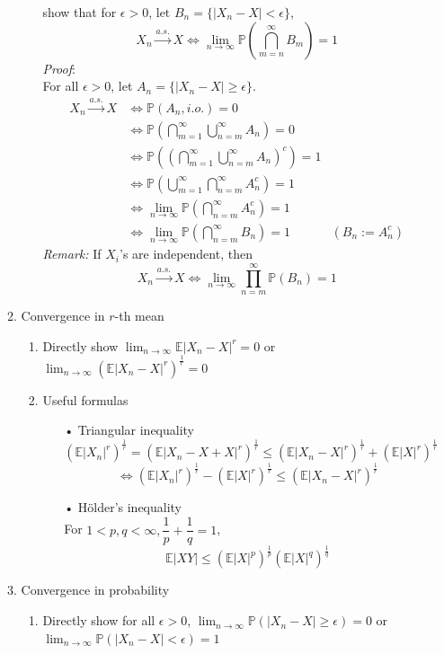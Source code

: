 \documentclass[11pt]{article}
\begin{document}
\begin{enumerate}
\begin{enumerate}
\begin{enumerate}
show that for $\epsilon>0$,  $\text{let }B_{n} = \{|X_{n} - X| < \epsilon \}$,
$$X_{n} \xrightarrow{a.s.} X \iff \lim_{n \to \infty} \mathbb{P}(\bigcap_{m=n}^{\infty}B_{m})=1$$
\textit{Proof}:\\
For all $\epsilon > 0$, let $A_{n} = \{|X_{n} - X| \geq \epsilon\}$.
\begin{align*}
X_{n} \xrightarrow{a.s.} X &\iff \mathbb{P}(A_{n}, i.o.) = 0\\
&\iff \mathbb{P}(\bigcap_{m=1}^{\infty} \bigcup_{n=m}^{\infty} A_{n}) = 0\\
&\iff \mathbb{P}((\bigcap_{m=1}^{\infty} \bigcup_{n=m}^{\infty} A_{n})^{c}) = 1\\
&\iff \mathbb{P}(\bigcup_{m=1}^{\infty} \bigcap_{n=m}^{\infty} A_{n}^{c}) = 1\\
&\iff \lim_{n \to \infty} \mathbb{P}(\bigcap_{n=m}^{\infty} A_{n}^{c}) =1\\
&\iff \lim_{n \to \infty} \mathbb{P}(\bigcap_{n=m}^{\infty} B_{n}) =1 &(B_{n} := A_{n}^{c})
\end{align*}
\textit{Remark:} If $X_{i}$'s are independent, then $$X_{n} \xrightarrow{a.s.} X  \iff \lim_{n \to \infty} \prod_{n=m}^{\infty} \mathbb{P}(B_{n}) =1$$
\end{enumerate}
\item{Convergence in $r$-th mean}
\begin{enumerate}
\item{Directly show $\lim_{n \to \infty} \mathbb{E}|X_{n} - X|^{r} = 0$ or $\lim_{n \to \infty}(\mathbb{E}|X_{n}-X|^{r})^{\frac{1}{r}} = 0$}
\item{Useful formulas}
\begin{enumerate}
\item[•]{Triangular inequality}
$$(\mathbb{E}|X_{n}|^{r})^{\frac{1}{r}} = (\mathbb{E}|X_{n} - X + X|^{r})^{\frac{1}{r}} \leq (\mathbb{E}|X_{n} -X|^{r})^{\frac{1}{r}}+(\mathbb{E}|X|^{r})^{\frac{1}{r}}$$
$$\iff (\mathbb{E}|X_{n}|^{r})^{\frac{1}{r}} - (\mathbb{E}|X|^{r})^{\frac{1}{r}} \leq (\mathbb{E}|X_{n} -X|^{r})^{\frac{1}{r}}$$
\item[•]{Hölder's inequality}\\
For $1 < p, q < \infty, \dfrac{1}{p} + \dfrac{1}{q} = 1$,
$$\mathbb{E}|XY| \leq (\mathbb{E}|X|^{p})^{\frac{1}{p}} (\mathbb{E}|X|^{q})^{\frac{1}{q}}$$
\end{enumerate}
\end{enumerate}
\item{Convergence in probability}
\begin{enumerate}
\item{Directly show for all $\epsilon > 0$, $\lim_{n \to \infty}\mathbb{P}(|X_{n} - X| \geq \epsilon) = 0$ or $\lim_{n \to \infty}\mathbb{P}(|X_{n} - X| < \epsilon) = 1$}

\end{enumerate}
\end{enumerate}
\end{enumerate}
\end{document}
